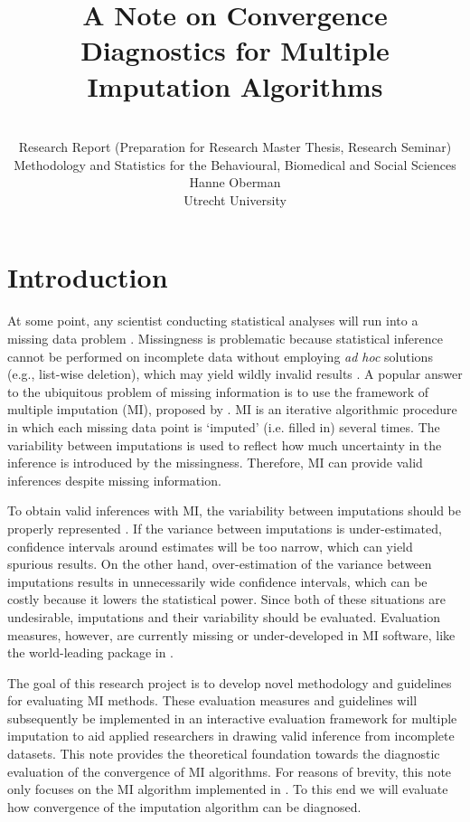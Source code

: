 \documentclass[article]{jss}
\author{\\Research Report (Preparation for Research Master Thesis, Research Seminar) \\ Methodology and Statistics for the Behavioural, Biomedical and Social Sciences \AND Hanne Oberman\\Utrecht University}
\title{A Note on Convergence Diagnostics for Multiple Imputation Algorithms}
\begin{document}

\section{Introduction} \label{sec:intro} %

At some point, any scientist conducting statistical analyses will run into a missing data problem \citep{alli02}. Missingness is problematic because statistical inference cannot be performed on incomplete data without employing \emph{ad hoc} solutions (e.g., list-wise deletion), which may yield wildly invalid results \citep{buur18}. A popular answer to the ubiquitous problem of missing information is to use the framework of multiple imputation (MI), proposed by \cite{rubin87}. MI is an iterative algorithmic procedure in which each missing data point is `imputed' (i.e. filled in) several times. The variability between imputations is used to reflect how much uncertainty in the inference is introduced by the missingness. Therefore, MI can provide valid inferences despite missing information. 

To obtain valid inferences with MI, the variability between imputations should be properly represented \citep{rubin87, buur18}. If the variance between imputations is under-estimated, confidence intervals around estimates will be too narrow, which can yield spurious results. On the other hand, over-estimation of the variance between imputations results in unnecessarily wide confidence intervals, which can be costly because it lowers the statistical power. Since both of these situations are undesirable, imputations and their variability should be evaluated. Evaluation measures, however, are currently missing or under-developed in MI software, like the world-leading  package \citep{mice} in  \citep{R}. %

The goal of this research project is to develop novel methodology and guidelines for evaluating MI methods. These evaluation measures and guidelines will subsequently be implemented in an interactive evaluation framework for multiple imputation to aid applied researchers in drawing valid inference from incomplete datasets. This note provides the theoretical foundation towards the diagnostic evaluation of the convergence of MI algorithms. %
For reasons of brevity, this note only focuses on the MI algorithm implemented in  \cite{mice}. %
To this end we will evaluate how convergence of the imputation algorithm can be diagnosed.
\end{document}
